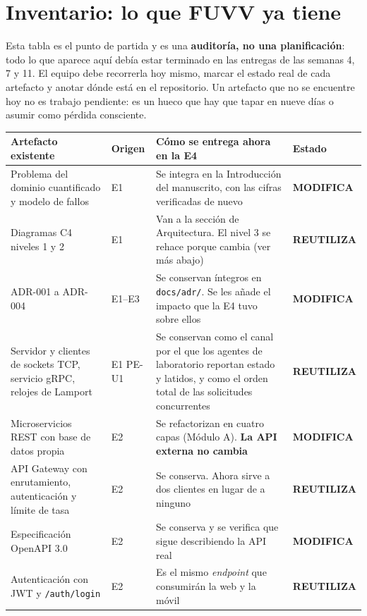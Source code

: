 \documentclass[11pt,a4paper]{article}
\newcommand{\reuso}{\cellcolor{filaReuso}\textbf{REUTILIZA}}
\newcommand{\cambia}{\cellcolor{filaCambia}\textbf{MODIFICA}}
\begin{document}
\section{Inventario: lo que FUVV ya tiene}

Esta tabla es el punto de partida y es una \textbf{auditoría, no una planificación}: todo lo que aparece aquí debía estar terminado en las entregas de las semanas 4, 7 y 11. El equipo debe recorrerla hoy mismo, marcar el estado real de cada artefacto y anotar dónde está en el repositorio. Un artefacto que no se encuentre hoy no es trabajo pendiente: es un hueco que hay que tapar en nueve días o asumir como pérdida consciente.

\begin{center}
	\footnotesize
	\begin{longtable}{@{}p{3.7cm}p{1.5cm}p{5.2cm}p{4.4cm}@{}}
		\toprule
		\textbf{Artefacto existente} & \textbf{Origen} & \textbf{Cómo se entrega ahora en la E4} & \textbf{Estado} \\
		\midrule
		\endhead
		Problema del dominio cuantificado y modelo de fallos & E1 & Se integra en la Introducción del manuscrito, con las cifras verificadas de nuevo & \cambia \\
		\addlinespace
		Diagramas C4 niveles 1 y 2 & E1 & Van a la sección de Arquitectura. El nivel 3 se rehace porque cambia (ver más abajo) & \reuso \\
		\addlinespace
		ADR-001 a ADR-004 & E1--E3 & Se conservan íntegros en \texttt{docs/adr/}. Se les añade el impacto que la E4 tuvo sobre ellos & \cambia \\
		\addlinespace
		Servidor y clientes de sockets TCP, servicio gRPC, relojes de Lamport & E1 \newline PE-U1 & Se conservan como el canal por el que los agentes de laboratorio reportan estado y latidos, y como el orden total de las solicitudes concurrentes & \reuso \\
		\addlinespace
		Microservicios REST con base de datos propia & E2 & Se refactorizan en cuatro capas (Módulo A). \textbf{La API externa no cambia} & \cambia \\
		\addlinespace
		API Gateway con enrutamiento, autenticación y límite de tasa & E2 & Se conserva. Ahora sirve a dos clientes en lugar de a ninguno & \reuso \\
		\addlinespace
		Especificación OpenAPI 3.0 & E2 & Se conserva y se verifica que sigue describiendo la API real & \cambia \\
		\addlinespace
		Autenticación con JWT y \texttt{/auth/login} & E2 & Es el mismo \emph{endpoint} que consumirán la web y la móvil & \reuso \\

\end{longtable}
\end{center}
\end{document}
